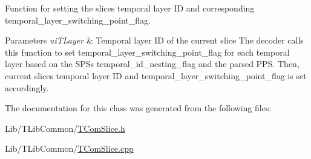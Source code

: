 Function for setting the slice\textquotesingle{}s temporal layer ID and corresponding temporal\+\_\+layer\+\_\+switching\+\_\+point\+\_\+flag. 
\begin{DoxyParams}{Parameters}
{\em ui\+T\+Layer} & Temporal layer ID of the current slice The decoder calls this function to set temporal\+\_\+layer\+\_\+switching\+\_\+point\+\_\+flag for each temporal layer based on the S\+PS\textquotesingle{}s temporal\+\_\+id\+\_\+nesting\+\_\+flag and the parsed P\+PS. Then, current slice\textquotesingle{}s temporal layer ID and temporal\+\_\+layer\+\_\+switching\+\_\+point\+\_\+flag is set accordingly. \\
\hline
\end{DoxyParams}


The documentation for this class was generated from the following files\+:\begin{DoxyCompactItemize}
\item 
Lib/\+T\+Lib\+Common/\hyperlink{_t_com_slice_8h}{T\+Com\+Slice.\+h}\item 
Lib/\+T\+Lib\+Common/\hyperlink{_t_com_slice_8cpp}{T\+Com\+Slice.\+cpp}\end{DoxyCompactItemize}
